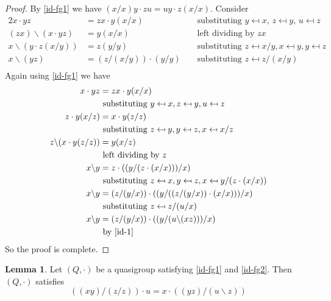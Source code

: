 \documentclass[12pt]{report}
\theoremstyle{definition}
\newtheorem{lem}[thm]{Lemma}
\newcommand{\ldv}{\backslash}       %
\newcommand{\rdv}{/}                %
\begin{document}
\begin{proof}
  By \ref{id-fg1} we have $(x\rdv x)y\cdot zu = uy \cdot z(x\rdv x)$. Consider
  \begin{alignat*}{2}
    x\cdot yz &= zx\cdot y(x\rdv x) &&\text{ substituting $y\mapsfrom x$, $z\mapsfrom y$, $u\mapsfrom z$}\\
    (zx)\ldv (x\cdot yz) &= y(x\rdv x) &&\text{ left dividing by $zx$}\\
    x\ldv(y\cdot z(x\rdv y)) &= z(y\rdv y) &&\text{ substituting $z\mapsfrom x\rdv y, x\mapsfrom y, y\mapsfrom z$}\\
    x\ldv (yz) &= (z\rdv(x\rdv y))\cdot (y\rdv y) &&\text{ substituting $z\mapsfrom z\rdv(x\rdv y)$}\label{id-1} \tag{I}\\
  \end{alignat*}
  Again using \ref{id-fg1} we have
  \begin{align*}
    x\cdot yz &= zx\cdot y(x\rdv x)\\
      &\text{ substituting $y\mapsfrom x, z\mapsfrom y, u\mapsfrom z$}\\
    z\cdot y(x\rdv z) &= x\cdot y(z\rdv z)\\
      &\text{ substituting $z\mapsfrom y, y\mapsfrom z, x\mapsfrom x\rdv z$}\\
    z\ldv (x\cdot y(z\rdv z)) &= y(x\rdv z)\\
      &\text{ left dividing by $z$}\\
    x\ldv y &= z\cdot ((y\rdv(z\cdot (x\rdv x)))\rdv x)\\
      &\text{ substituting $z\mapsfrom x, y\mapsfrom z, x\mapsfrom y\rdv (z\cdot (x\rdv x))$}\\
    x\ldv y &= (z\rdv(y\rdv x))\cdot ((y\rdv((z\rdv(y\rdv x))\cdot (x\rdv x)))\rdv x)\\
      &\text{ substituting $z\mapsfrom z\rdv (u\rdv x)$}\\
    x\ldv y &= (z\rdv (y\rdv x))\cdot ((y\rdv (u\ldv(xz)))\rdv x)\\
      &\text{ by \ref{id-1}}
  \end{align*}
  So the proof is complete.
\end{proof}

\begin{lem}\label{lem-40}
  Let $(Q, \cdot)$ be a quasigroup satisfying \ref{id-fg1} and \ref{id-fg2}.
    Then $(Q, \cdot)$ satisfies
  \[((xy)\rdv (z\rdv z))\cdot u = x\cdot ((yz)\rdv (u\ldv z))\]
\end{lem}
\end{document}

